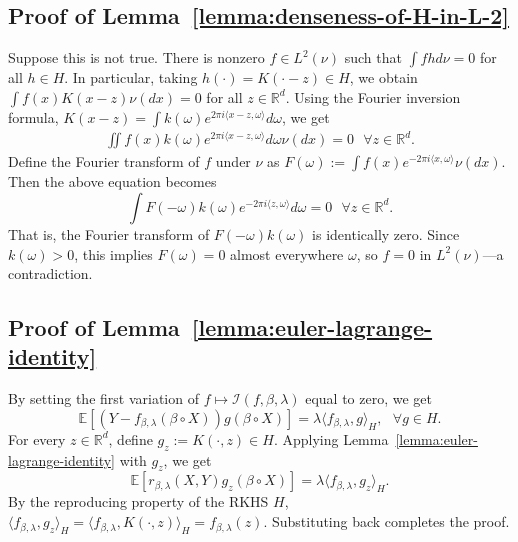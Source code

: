 \documentclass[sn-mathphys-num]{sn-jnl}%
\numberwithin{equation}{section}
\newcommand{\R}{\mathbb{R}}
\newcommand{\E}{\mathbb{E}}
\newcommand{\kernel}{K}
\theoremstyle{thmstyleone}%
\theoremstyle{thmstyletwo}%
\theoremstyle{thmstylethree}%
\begin{document}
\subsection{Proof of Lemma~\ref{lemma:denseness-of-H-in-L-2}}
\label{sec:proof-of-lemma-denseness-of-H-in-L-2}
Suppose this is not true. There is nonzero $f \in L^2(\nu)$ such that $\int f h d\nu = 0$ 
for all $h \in H$. In particular, taking $h(\cdot) = \kernel(\cdot - z) \in H$, we obtain
$\int f(x) \kernel(x-z)\nu(dx) = 0$ for all $z \in \R^d$.  Using the Fourier inversion formula, 
$\kernel(x-z) =  \int k(\omega) e^{2\pi i \langle x-z, \omega\rangle} d\omega$, we get
\begin{equation*}
\begin{split} 
	\iint f(x)  k(\omega) e^{2\pi i \langle x-z, \omega\rangle} d\omega \nu(dx) = 0~~~\forall z \in \R^d.
\end{split} 
\end{equation*} 
Define the Fourier transform of $f$ under $\nu$ as $F(\omega) := \int f(x) e^{-2\pi i \langle x, \omega \rangle} \nu(dx)$. Then the above equation becomes
\begin{equation*}
	\int F(-\omega) k(\omega) e^{-2\pi i\langle z, \omega\rangle}  d\omega = 0~~~\forall z \in \R^d.
\end{equation*} 
That is, the Fourier transform of $F(-\omega) k (\omega)$ is identically zero. 
Since $k(\omega) > 0$, this implies $F(\omega) = 0$ almost everywhere $\omega$, so $f = 0$ in $L^2(\nu)$---a contradiction.



\subsection{Proof of Lemma~\ref{lemma:euler-lagrange-identity}}
\label{sec:proof-of-lemma-euler-lagrange-identity}
By setting the first variation of $f \mapsto \mathcal{I}(f,\beta,\lambda)$ equal to zero, we get 
\begin{equation*}
	\E[(Y- f_{\beta, \lambda}(\beta \circ X)) g(\beta \circ X)] = \lambda \langle f_{\beta, \lambda}, g\rangle_H,~~~\forall g\in H.
\end{equation*}
For every $z \in \R^d$, define $g_{z} := \kernel(\cdot, z) \in H$. Applying Lemma~\ref{lemma:euler-lagrange-identity} with $g_{z}$, we get 
\begin{equation*}
	\E[r_{\beta, \lambda}(X, Y) g_{z}(\beta \circ X)]
		= \lambda \langle f_{\beta, \lambda}, g_{z}\rangle_H.	
\end{equation*}
By the reproducing property of the RKHS $H$, $\langle f_{\beta, \lambda}, g_{z}\rangle_H = \langle f_{\beta, \lambda}, \kernel(\cdot, z)\rangle_H = f_{\beta, \lambda}(z)$. Substituting back completes the proof.
\end{document}
